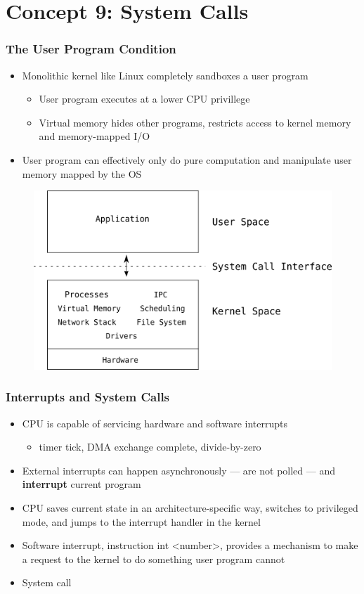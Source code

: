 \documentclass[11pt,xcolor=dvipsnames]{beamer}
\begin{document}
\section{Concept 9: System Calls}

\begin{frame}[fragile,t]
\frametitle{The User Program Condition}
\begin{itemize}
  \item Monolithic kernel like Linux completely sandboxes a user program
  \begin{itemize}
  \item User program executes at a lower CPU privillege
  \item Virtual memory hides other programs, restricts access to kernel memory and memory-mapped I/O
  \end{itemize}
  \pause
  \item User program can effectively only do pure computation and manipulate user memory mapped by the OS
\end{itemize}
\begin{figure}
\centering
\includegraphics[height=0.45\paperheight]{figures/monolithic.png}
\end{figure}
\end{frame}

\begin{frame}[fragile,t]
\frametitle{Interrupts and System Calls}
\begin{itemize}
  \item CPU is capable of servicing hardware and software interrupts
  \begin{itemize}
    \item timer tick, DMA exchange complete, divide-by-zero
  \end{itemize}
  \item External interrupts can happen asynchronously --- are not polled --- and \textbf{interrupt} current program
  \item CPU saves current state in an architecture-specific way, switches to privileged mode, and jumps to the interrupt handler in the kernel
  \pause
  \item Software interrupt, instruction {\ttfamily int <number>}, provides a mechanism to make a request to the kernel to do something user program cannot
  \item System call
\end{itemize}
\end{frame}
\end{document}
